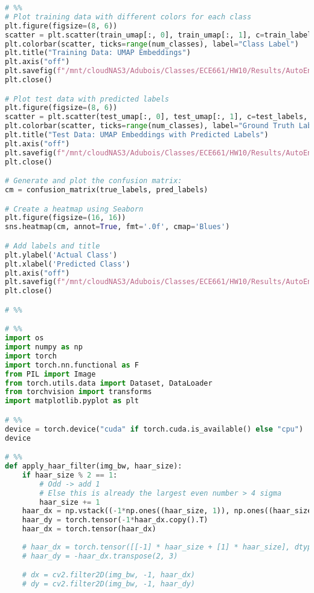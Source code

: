 \documentclass{article}
\begin{document}
\begin{lstlisting}[language=Python]
# %%
# Plot training data with different colors for each class
plt.figure(figsize=(8, 6))
scatter = plt.scatter(train_umap[:, 0], train_umap[:, 1], c=train_labels, cmap='tab20', alpha=0.7)
plt.colorbar(scatter, ticks=range(num_classes), label="Class Label")
plt.title("Training Data: UMAP Embeddings")
plt.axis("off")
plt.savefig(f"/mnt/cloudNAS3/Adubois/Classes/ECE661/HW10/Results/AutoEncoder/UMAP/train_umap_{p}.jpg")
plt.close()

# Plot test data with predicted labels
plt.figure(figsize=(8, 6))
scatter = plt.scatter(test_umap[:, 0], test_umap[:, 1], c=test_labels, cmap='tab20', alpha=0.7)
plt.colorbar(scatter, ticks=range(num_classes), label="Ground Truth Label")
plt.title("Test Data: UMAP Embeddings with Predicted Labels")
plt.axis("off")
plt.savefig(f"/mnt/cloudNAS3/Adubois/Classes/ECE661/HW10/Results/AutoEncoder/UMAP/test_umap_{p}.jpg")
plt.close()

# Generate and plot the confusion matrix:
cm = confusion_matrix(true_labels, pred_labels)

# Create a heatmap using Seaborn
plt.figure(figsize=(16, 16))
sns.heatmap(cm, annot=True, fmt='.0f', cmap='Blues')

# Add labels and title
plt.ylabel('Actual Class')
plt.xlabel('Predicted Class')
plt.axis("off")
plt.savefig(f"/mnt/cloudNAS3/Adubois/Classes/ECE661/HW10/Results/AutoEncoder/Confusion_Mat/conf_mat_{p}.jpg")
plt.close()

# %%

# %%
import os
import numpy as np
import torch
import torch.nn.functional as F
from PIL import Image
from torch.utils.data import Dataset, DataLoader
from torchvision import transforms
import matplotlib.pyplot as plt

# %%
device = torch.device("cuda" if torch.cuda.is_available() else "cpu")
device

# %%
def apply_haar_filter(img_bw, haar_size):
    if haar_size % 2 == 1:
        # Odd -> add 1
        # Else this is already the largest even number > 4 sigma
        haar_size += 1
    haar_dx = np.vstack((-1*np.ones((haar_size, 1)), np.ones((haar_size, 1)) ))
    haar_dy = torch.tensor(-1*haar_dx.copy().T)
    haar_dx = torch.tensor(haar_dx)
    
    # haar_dx = torch.tensor([[-1] * haar_size + [1] * haar_size], dtype=torch.float32).unsqueeze(0).unsqueeze(0)
    # haar_dy = -haar_dx.transpose(2, 3)

    # dx = cv2.filter2D(img_bw, -1, haar_dx)
    # dy = cv2.filter2D(img_bw, -1, haar_dy)
    

\end{lstlisting}
\end{document}

